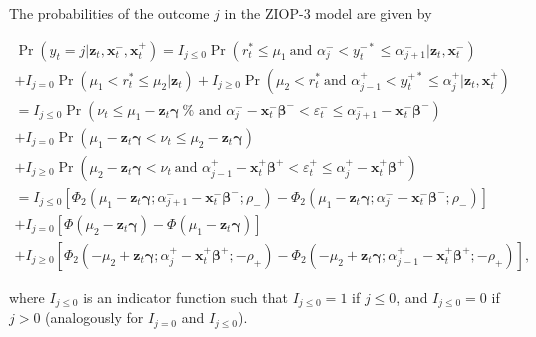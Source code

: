 \documentclass[letterpaper,fleqn,12pt]{article}
\begin{document}
\begin{onehalfspace}
\bigskip

The probabilities of the outcome $j$ in the ZIOP-3 model are given by

\begin{flushleft}
\begin{equation}
\begin{array}{l}
\Pr (y_{t}=j|\mathbf{z}_{t},\mathbf{x}_{t}^{-},\mathbf{x}_{t}^{+})=I_{j\leq
0}\Pr (r_{t}^{\ast }\leq \mu _{1}\ \text{and }\alpha _{j}^{-}<y_{t}^{-\ast
}\leq \alpha _{j+1}^{-}|\mathbf{z}_{t},\mathbf{x}_{t}^{-}) \\ 
+I_{j=0}\Pr (\mu _{1}<r_{t}^{\ast }\leq \mu _{2}|\mathbf{z}_{t})+I_{j\geq
0}\Pr (\mu _{2}<r_{t}^{\ast }\ \text{and }\alpha _{j-1}^{+}<y_{t}^{+\ast
}\leq \alpha _{j}^{+}|\mathbf{z}_{t},\mathbf{x}_{t}^{+}) \\ 
=I_{j\leq 0}\Pr (\nu _{t}\leq \mu _{1}-\mathbf{z}_{t}\mathbf{\gamma }\ \text{%
and }\alpha _{j}^{-}-\mathbf{x}_{t}^{-}\mathbf{\beta }^{-}<\varepsilon
_{t}^{-}\leq \alpha _{j+1}^{-}-\mathbf{x}_{t}^{-}\mathbf{\beta }^{-}) \\ 
+I_{j=0}\Pr (\mu _{1}-\mathbf{z}_{t}\mathbf{\gamma }<\nu _{t}\leq \mu _{2}-%
\mathbf{z}_{t}\mathbf{\gamma }) \\ 
+I_{j\geq 0}\Pr (\mu _{2}-\mathbf{z}_{t}\mathbf{\gamma }<\nu _{t}\ \text{and 
}\alpha _{j-1}^{+}-\mathbf{x}_{t}^{+}\mathbf{\beta }^{+}<\varepsilon
_{t}^{+}\leq \alpha _{j}^{+}-\mathbf{x}_{t}^{+}\mathbf{\beta }^{+}) \\ 
=I_{j\leq 0}[\Phi _{2}(\mu _{1}-\mathbf{z}_{t}\mathbf{\gamma };\alpha
_{j+1}^{-}-\mathbf{x}_{t}^{-}\mathbf{\beta }^{-}\mathbf{;}\rho _{-})-\Phi
_{2}(\mu _{1}-\mathbf{z}_{t}\mathbf{\gamma };\alpha _{j}^{-}-\mathbf{x}%
_{t}^{-}\mathbf{\beta }^{-}\mathbf{;}\rho _{-})] \\ 
+I_{j=0}[\Phi (\mu _{2}-\mathbf{z}_{t}\mathbf{\gamma })-\Phi (\mu _{1}-%
\mathbf{z}_{t}\mathbf{\gamma })] \\ 
+I_{j\geq 0}[\Phi _{2}(-\mu _{2}+\mathbf{z}_{t}\mathbf{\gamma };\alpha
_{j}^{+}-\mathbf{x}_{t}^{+}\mathbf{\beta }^{+};\mathbf{-}\rho _{+})-\Phi
_{2}(-\mu _{2}+\mathbf{z}_{t}\mathbf{\gamma };\alpha _{j-1}^{+}-\mathbf{x}%
_{t}^{+}\mathbf{\beta }^{+};\mathbf{-}\rho _{+})]\text{,}%
\end{array}
\label{Prob CroNOP}
\end{equation}
\end{flushleft}

\noindent where $I_{j\leq 0}$ is an indicator function such that $I_{j\leq
0}=1$ if $j\leq 0$, and $I_{j\leq 0}=0$ if $j>0$ (analogously for $I_{j=0}$
and $I_{j\leq 0}$).


\end{onehalfspace}
\end{document}
